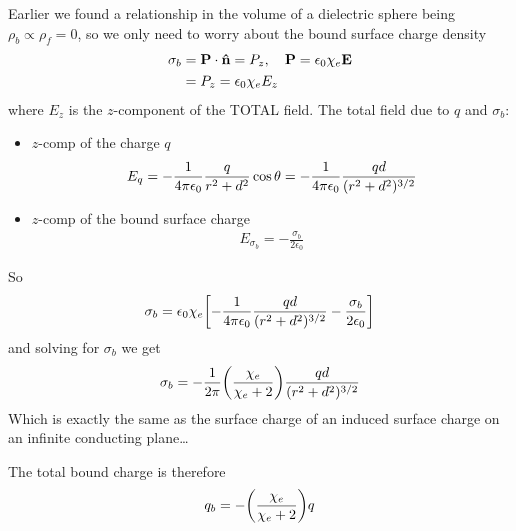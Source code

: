 \documentclass[../main.tex]{subfiles}
\begin{document}
Earlier we found a relationship in the volume of a dielectric sphere being $\rho_b \propto \rho_f = 0$,
so we only need to worry about the bound surface charge density
\begin{align*}
    \sigma_b &= \vb P \cdot \vu n = P_z, \quad \vb P = \epsilon_0 \chi_e \vb E \\
    &= P_z = \epsilon_0 \chi_e E_z
\end{align*}
where $E_z$ is the $z$-component of the TOTAL field. The total field due to $q$ and $\sigma_b$:
\begin{itemize}
    \item $z$-comp of the charge $q$
    \begin{align*}
        E_q = -\frac{1}{4\pi\epsilon_0} \frac{q}{r^2 + d^2} \cos\theta = -\frac{1}{4\pi\epsilon_0} \frac{qd}{(r^2 + d^2)^{3/2}}
    \end{align*}
    \item $z$-comp of the bound surface charge
    \begin{align*}
        E_{\sigma_b} = -\frac{\sigma_b}{2\epsilon_0} 
    \end{align*}
\end{itemize}
So
\begin{align*}
    \sigma_b = \epsilon_0 \chi_e \qt[
        -\ke \frac{qd}{(r^2 + d^2)^{3/2}} - \frac{\sigma_b}{2\epsilon_0}
    ]
\end{align*}
and solving for $\sigma_b$ we get
\begin{align*}
    \sigma_b = -\frac{1}{2\pi} \qt(\frac{\chi_e}{\chi_e + 2}) \frac{qd}{(r^2 + d^2)^{3/2}}
\end{align*}
Which is exactly the same as the surface charge of an induced surface charge on an infinite conducting plane\dots

The total bound charge is therefore
\begin{align*}
    q_b = -\qt(\frac{\chi_e}{\chi_e + 2}) q
\end{align*}
\end{document}
